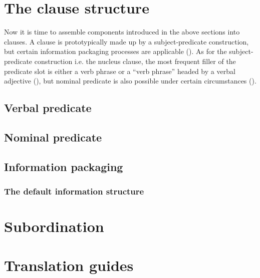 \documentclass[UTF8, a4paper, oneside, scheme=plain]{ctexart}
\newcommand*{\citesec}[1]{\S~{#1}}
\begin{document}
\section{The clause structure}

Now it is time to assemble components introduced in the above sections into clauses.
A clause is prototypically made up by a subject-predicate construction,
but certain information packaging processes are applicable (). 
As for the subject-predicate construction i.e. the nucleus clause,
the most frequent filler of the predicate slot is either 
a verb phrase or a ``verb phrase'' headed by a verbal adjective (),
but nominal predicate is also possible under certain circumstances (). 


\subsection{Verbal predicate}\label{sec:verbal-predicate}

\subsection{Nominal predicate}\label{sec:nominal-predicate}

\citet[\citesec{7.6}]{zhudexigrammar}


\subsection{Information packaging}\label{sec:information-packaging}

\subsubsection{The default information structure}


\section{Subordination}

\section{Translation guides}



\end{document}
